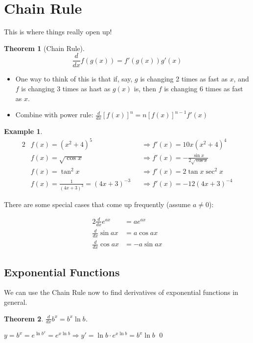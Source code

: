 \documentclass[letterpaper, 11pt, openany]{book}
\theoremstyle{mytheoremstyle}
\newtheorem{theorem}{Theorem}[section]
\renewenvironment{proof}{{\par \sffamily \smaller \fontseries{b}\selectfont Proof}}{\hfill\qed}
\theoremstyle{myexamplestyle}
\newtheorem{example}{Example}[section]
\begin{document}
\section{Chain Rule}

This is where things really open up!

\begin{theorem}[Chain Rule]\label{t:chain-rule}
    \[\frac{d}{dx} f(g(x)) = f'(g(x))g'(x)\]
\end{theorem}

\begin{itemize}
    \item One way to think of this is that if, say, \(g\) is changing 2 times as fast as \(x\), and \(f\) is changing 3 times as hast as \(g(x)\) is, then \(f\) is changing 6 times as fast as \(x\).
    \item Combine with power rule: \(\frac{d}{dx} \left[f(x)\right]^{n} = n \left[f(x)\right]^{n-1}f'(x)\)
\end{itemize}

\begin{example}
    \begin{alignat*}{2}
        &f(x) =  (x^{2} + 4)^{5} && \Rightarrow f'(x) = 10x(x^{2} + 4)^{4}\\
        &f(x) =  \sqrt{\cos x} && \Rightarrow f'(x) = -\frac{\sin x}{2 \sqrt{\cos x}}\\
        &f(x) =  \tan^{2} x && \Rightarrow f'(x) = 2\tan x \sec^{2} x\\
        &f(x) =   \frac{1}{(4x+3)^{3}} = (4x+3)^{-3} && \Rightarrow f'(x) = -12(4x+3)^{-4} 
    \end{alignat*}
\end{example}

There are some special cases that come up frequently (assume \(a \neq 0\)):

\begin{alignat*}{2}
    \frac{d}{dx} e^{ax} &= a e^{ax}\\
    \frac{d}{dx} \sin ax &= a \cos ax\\
    \frac{d}{dx} \cos ax &= -a \sin ax
\end{alignat*}

\subsection{Exponential Functions}
We can use the Chain Rule now to find derivatives of exponential functions in general.

\begin{theorem}\label{t:deriv-exponential}
    \(\frac{d}{dx} b^{x} = b^{x}\ln b\).
\end{theorem}
\begin{proof}
    \(y = b^{x} = e^{\ln b^{x}} = e^{x\ln b} \Rightarrow y' = \ln b \cdot e^{x\ln b} = b^{x}\ln b\)
\end{proof}
\end{document}
